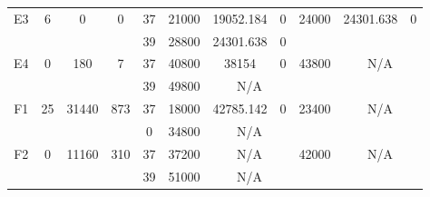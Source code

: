 \begin{sidewaystable}
\begin{tabular}{c||c|c|c||c|c|c|c||c|c|c}
         &
        
      \\
      \hline
      \multirow{2}{*}{E3} &
      \multirow{2}{*}{6} &
      \multirow{2}{*}{0} &
      \multirow{2}{*}{0} &
      37 &
      21000 &
        19052.184 &
        0 &
      \multirow{2}{*}{24000} &
        \multirow{2}{*}{24301.638} &
        \multirow{2}{*}{0}
      \\
      \cline{5-8}
       &
       &
       &
       &
      39 &
      28800 &
        24301.638 &
        0 &
      
         &
        
      \\
      \hline
      \multirow{2}{*}{E4} &
      \multirow{2}{*}{0} &
      \multirow{2}{*}{180} &
      \multirow{2}{*}{7} &
      37 &
      40800 &
        38154 &
        0 &
      \multirow{2}{*}{43800} &
        \multicolumn{2}{c}{\multirow{2}{*}{N/A}}
      \\
      \cline{5-8}
       &
       &
       &
       &
      39 &
      49800 &
        \multicolumn{2}{|c||}{N/A} &
      
        
      \\
      \hline
      \multirow{2}{*}{F1} &
      \multirow{2}{*}{25} &
      \multirow{2}{*}{31440} &
      \multirow{2}{*}{873} &
      37 &
      18000 &
        42785.142 &
        0 &
      \multirow{2}{*}{23400} &
        \multicolumn{2}{c}{\multirow{2}{*}{N/A}}
      \\
      \cline{5-8}
       &
       &
       &
       &
      0 &
      34800 &
        \multicolumn{2}{|c||}{N/A} &
      
        
      \\
      \hline
      \multirow{2}{*}{F2} &
      \multirow{2}{*}{0} &
      \multirow{2}{*}{11160} &
      \multirow{2}{*}{310} &
      37 &
      37200 &
        \multicolumn{2}{|c||}{N/A} &
      \multirow{2}{*}{42000} &
        \multicolumn{2}{c}{\multirow{2}{*}{N/A}}
      \\
      \cline{5-8}
       &
       &
       &
       &
      39 &
      51000 &
        \multicolumn{2}{|c||}{N/A} &
      
        
      \\
\end{tabular}
\label{table:RASDATASET3} 
\end{sidewaystable}
